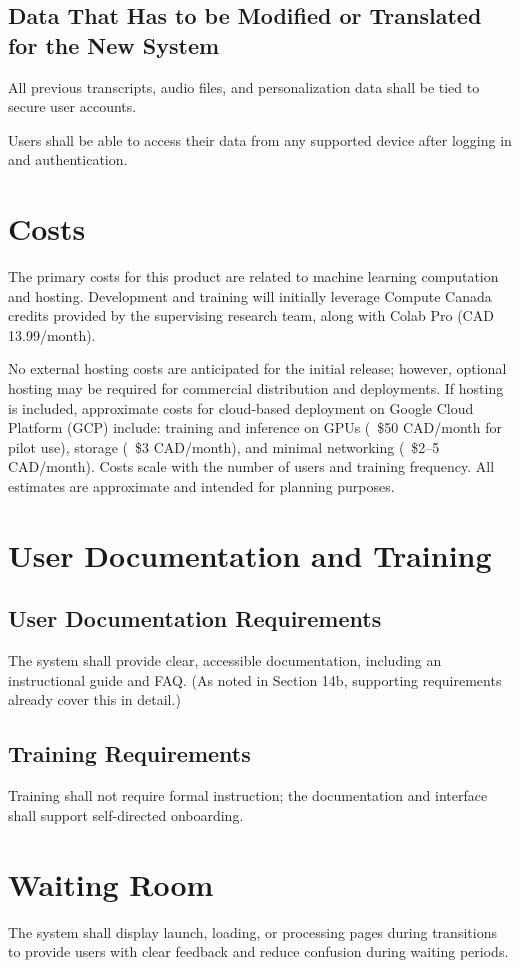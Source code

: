 \documentclass[12pt]{article}
\begin{document}
\subsection{Data That Has to be Modified or Translated for the New System}
All previous transcripts, audio files, and personalization data shall be tied to secure user accounts.

Users shall be able to access their data from any supported device after logging in and authentication.

\section{Costs}
The primary costs for this product are related to machine learning computation and hosting. Development and training will initially leverage Compute Canada credits provided by the supervising research team, along with Colab Pro (CAD 13.99/month).

No external hosting costs are anticipated for the initial release; however, optional hosting may be required for commercial distribution and deployments. If hosting is included, approximate costs for cloud-based deployment on Google Cloud Platform (GCP) include: training and inference on GPUs (~\$50 CAD/month for pilot use), storage (~\$3 CAD/month), and minimal networking (~\$2–5 CAD/month). Costs scale with the number of users and training frequency. All estimates are approximate and intended for planning purposes.
\section{User Documentation and Training}
\subsection{User Documentation Requirements}
The system shall provide clear, accessible documentation, including an instructional guide and FAQ. (As noted in Section 14b, supporting requirements already cover this in detail.)

\subsection{Training Requirements}
Training shall not require formal instruction; the documentation and interface shall support self-directed onboarding.

\section{Waiting Room}
The system shall display launch, loading, or processing pages during transitions to provide users with clear feedback and reduce confusion during waiting periods.
\end{document}
